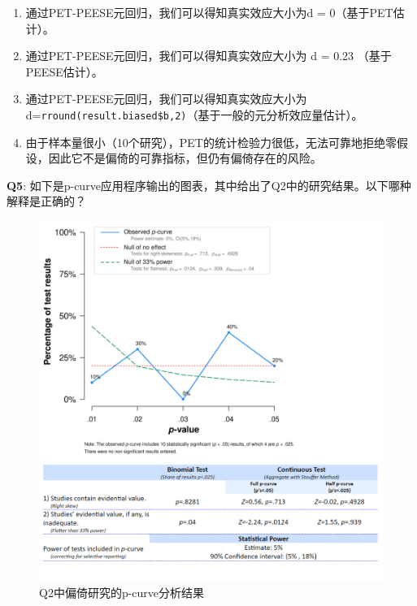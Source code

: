 \documentclass[
  letterpaper,
  DIV=11,
  numbers=noendperiod]{scrreprt}
\providecommand{\tightlist}{%
  \setlength{\itemsep}{0pt}\setlength{\parskip}{0pt}}\usepackage{longtable,booktabs,array}
\begin{document}
\begin{enumerate}
\def\labelenumi{\Alph{enumi})}
\tightlist
\item
  通过PET-PEESE元回归，我们可以得知真实效应大小为d = 0（基于PET估计）。
\item
  通过PET-PEESE元回归，我们可以得知真实效应大小为 d = 0.23
  （基于PEESE估计）。
\item
  通过PET-PEESE元回归，我们可以得知真实效应大小为d=\texttt{rround(result.biased\$b,2)}（基于一般的元分析效应量估计）。
\item
  由于样本量很小（10个研究），PET的统计检验力很低，无法可靠地拒绝零假设，因此它不是偏倚的可靠指标，但仍有偏倚存在的风险。
\end{enumerate}

\textbf{Q5}:
如下是p-curve应用程序输出的图表，其中给出了Q2中的研究结果。以下哪种解释是正确的？

\begin{figure}

{\centering \includegraphics[width=1\textwidth,height=\textheight]{images/pcurveresultq5.png}

}

\caption{\label{fig-pcurveresultq5}Q2中偏倚研究的p-curve分析结果}

\end{figure}
\end{document}
